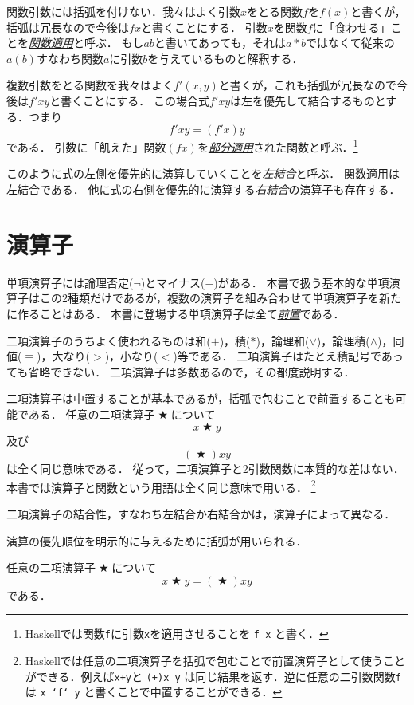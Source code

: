 \documentclass[twocolumn]{jsbook}
\newcommand{\keyword}[1]{\underline{\emph{#1}}}
\newcommand{\code}[1]{\texttt{#1}}
\newenvironment{point}{\begin{screen}}{\end{screen}}
\DeclareMathOperator{\mathAnyBinaryOperator}{\bigstar}
\begin{document}
関数引数には括弧を付けない．我々はよく引数$x$をとる関数$f$を$f(x)$と書くが，括弧は冗長なので今後は$fx$と書くことにする．
引数$x$を関数$f$に「食わせる」ことを\keyword{関数適用}と呼ぶ．
もし$ab$と書いてあっても，それは$a*b$ではなくて従来の$a(b)$すなわち関数$a$に引数$b$を与えているものと解釈する．

複数引数をとる関数を我々はよく$f'(x,y)$と書くが，これも括弧が冗長なので今後は$f'xy$と書くことにする．
この場合式$f'xy$は左を優先して結合するものとする．つまり$$f'xy=(f'x)y$$である．
引数に「飢えた」関数$(fx)$を\keyword{部分適用}された関数と呼ぶ．\footnote{Haskellでは関数\code{f}に引数\code{x}を適用させることを \code{f x} と書く．}

このように式の左側を優先的に演算していくことを\keyword{左結合}と呼ぶ．
関数適用は左結合である．
他に式の右側を優先的に演算する\keyword{右結合}の演算子も存在する．

\section{演算子}

単項演算子には論理否定($\neg$)とマイナス($-$)がある．
本書で扱う基本的な単項演算子はこの2種類だけであるが，複数の演算子を組み合わせて単項演算子を新たに作ることはある．
本書に登場する単項演算子は全て\keyword{前置}である．

二項演算子のうちよく使われるものは和($+$)，積($*$)，論理和($\vee$)，論理積($\wedge$)，同値($\equiv$)，大なり($>$)，小なり($<$)等である．
二項演算子はたとえ積記号であっても省略できない．
二項演算子は多数あるので，その都度説明する．

二項演算子は中置することが基本であるが，括弧で包むことで前置することも可能である．
任意の二項演算子$\mathAnyBinaryOperator$について$$x\mathAnyBinaryOperator y$$及び$$(\mathAnyBinaryOperator)xy$$は全く同じ意味である．
従って，二項演算子と2引数関数に本質的な差はない．
本書では演算子と関数という用語は全く同じ意味で用いる．
\footnote{Haskellでは任意の二項演算子を括弧で包むことで前置演算子として使うことができる．例えば\code{x+y}と \code{(+)x y} は同じ結果を返す．逆に任意の二引数関数\code{f}は \code{x `f` y} と書くことで中置することができる．}

二項演算子の結合性，すなわち左結合か右結合かは，演算子によって異なる．

演算の優先順位を明示的に与えるために括弧が用いられる．

\begin{point}
任意の二項演算子$\mathAnyBinaryOperator$について$$x\mathAnyBinaryOperator y=(\mathAnyBinaryOperator)xy$$である．
\end{point}
\end{document}
